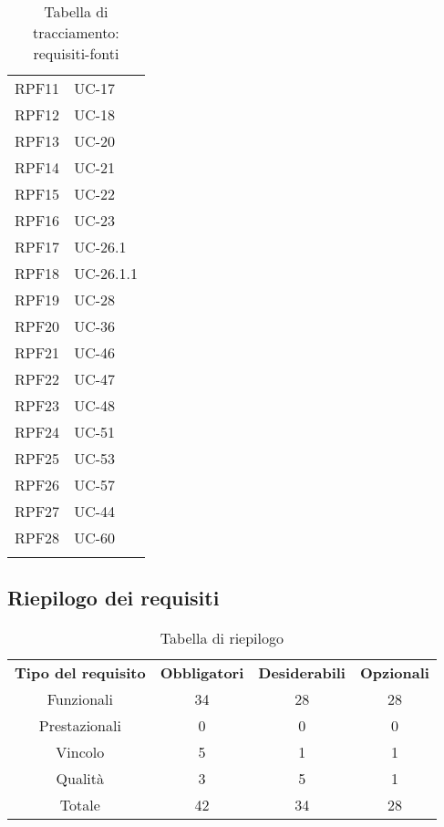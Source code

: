 \begin{longtable}{| p{5cm} | p{5cm} |}
		\rowcolor{LightGray}
		RPF11 & UC-17\\
		RPF12 & UC-18\\
		\rowcolor{LightGray}
		RPF13 & UC-20\\
		RPF14 & UC-21\\
		\rowcolor{LightGray}
		RPF15 & UC-22\\
		RPF16 & UC-23\\
		\rowcolor{LightGray}
		RPF17 & UC-26.1\\
		RPF18 & UC-26.1.1\\
		\rowcolor{LightGray}
		RPF19 & UC-28\\
		RPF20 & UC-36\\
		\rowcolor{LightGray}
		RPF21 & UC-46\\
		RPF22 & UC-47\\
		\rowcolor{LightGray}
		RPF23 & UC-48\\
		RPF24 & UC-51\\
		\rowcolor{LightGray}
		RPF25 & UC-53\\
		RPF26 & UC-57\\	
		\rowcolor{LightGray}
		RPF27 & UC-44\\
		RPF28 & UC-60\\
		\rowcolor{LightGray}
		\hline
		\caption{Tabella di tracciamento: requisiti-fonti}
\end{longtable}

\subsection{Riepilogo dei requisiti}
\begin{table}[h]
\centering
\begin{tabular}{| c | c | c | c |}
		\rowcolor{LightBlue}
		\color{white}\bfseries Tipo del requisito & \color{white}\bfseries Obbligatori & \color{white}\bfseries Desiderabili & \color{white}\bfseries Opzionali \\[0.25cm]
		 Funzionali & 34 & 28 & 28 \\
		 Prestazionali & 0 & 0 & 0 \\
		 Vincolo & 5 & 1 & 1 \\
		 Qualità & 3 & 5 & 1 \\
		 Totale & 42 & 34 & 28 \\ \hline
\end{tabular}
		\caption{Tabella di riepilogo}
\end{table}


\newpage